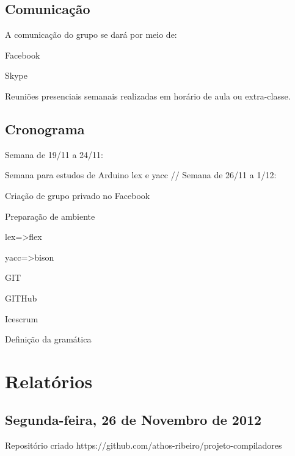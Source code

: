 \documentclass{abnt}
\begin{document}
\section{Comunicação}
    A comunicação do grupo se dará por meio de:

    Facebook

    Skype

    Reuniões presenciais semanais realizadas em horário de aula ou extra-classe.

\section{Cronograma}
    Semana de 19/11 a 24/11:

        Semana para estudos de Arduino lex e yacc
//
    Semana de 26/11 a 1/12:

        Criação de grupo privado no Facebook

        Preparação de ambiente

            lex=>flex

            yacc=>bison

            GIT

            GITHub

            Icescrum

        Definição da gramática

\chapter{Relatórios}
\section{Segunda-feira, 26 de Novembro de 2012}
Repositório criado
    https://github.com/athos-ribeiro/projeto-compiladores
\end{document}
